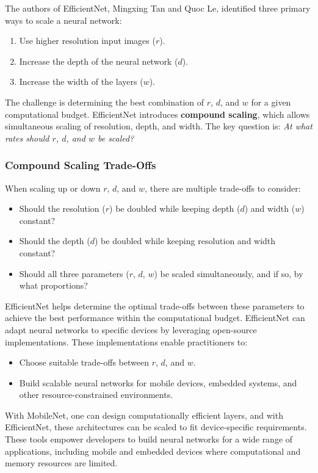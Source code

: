 \documentclass[letterpaper,12pt,notitlepage,twoside]{report}
\begin{document}
The authors of EfficientNet, Mingxing Tan and Quoc Le, identified three primary ways to scale a neural network:
\begin{enumerate}[nosep]
    \item Use higher resolution input images (\(r\)).
    \item Increase the depth of the neural network (\(d\)).
    \item Increase the width of the layers (\(w\)).
\end{enumerate}

The challenge is determining the best combination of \(r\), \(d\), and \(w\) for a given computational budget. EfficientNet introduces \textbf{compound scaling}, which allows simultaneous scaling of resolution, depth, and width. The key question is: \textit{At what rates should \(r\), \(d\), and \(w\) be scaled?}

\subsubsection*{Compound Scaling Trade-Offs}
When scaling up or down \(r\), \(d\), and \(w\), there are multiple trade-offs to consider:
\begin{itemize}[nosep]
    \item Should the resolution (\(r\)) be doubled while keeping depth (\(d\)) and width (\(w\)) constant?
    \item Should the depth (\(d\)) be doubled while keeping resolution and width constant?
    \item Should all three parameters (\(r\), \(d\), \(w\)) be scaled simultaneously, and if so, by what proportions?
\end{itemize}

EfficientNet helps determine the optimal trade-offs between these parameters to achieve the best performance within the computational budget. EfficientNet can adapt neural networks to specific devices by leveraging open-source implementations. These implementations enable practitioners to:
\begin{itemize}[nosep]
    \item Choose suitable trade-offs between \(r\), \(d\), and \(w\).
    \item Build scalable neural networks for mobile devices, embedded systems, and other resource-constrained environments.
\end{itemize}

With MobileNet, one can design computationally efficient layers, and with EfficientNet, these architectures can be scaled to fit device-specific requirements. These tools empower developers to build neural networks for a wide range of applications, including mobile and embedded devices where computational and memory resources are limited.
\end{document}
